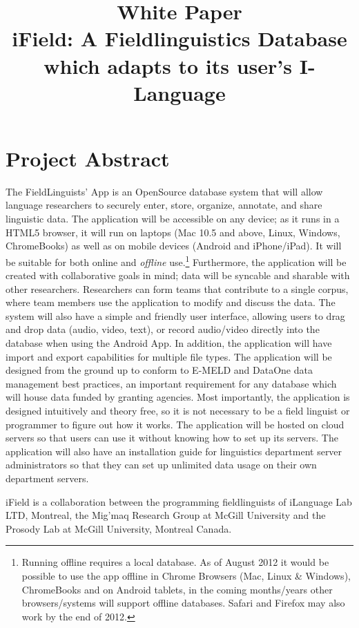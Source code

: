 \documentclass[12 pt]{article}
\title{White Paper \\ iField: A Fieldlinguistics Database which adapts to its user's I-Language}
\author{}
\date{}
\begin{document}
\maketitle{} 

\tableofcontents

\section {Project Abstract}

The FieldLinguists' App is an OpenSource database system that will allow language researchers to securely enter, store, organize, annotate, and share linguistic data. The application will be accessible on any device; as it runs in a HTML5 browser, it will run on laptops (Mac  10.5 and above, Linux, Windows, ChromeBooks) as well as on mobile devices (Android and iPhone/iPad).  It will be suitable for both online and \emph{offline} use.\footnote{Running offline requires  a local database. As of August 2012 it would be possible to use the app offline in Chrome Browsers (Mac, Linux \& Windows), ChromeBooks and on Android tablets, in the coming months/years other browsers/systems will support offline databases. Safari and Firefox may also work by the end of 2012.}  Furthermore, the application will be created with collaborative goals in mind;  data will be syncable and sharable with other researchers.  Researchers can form teams that contribute to a single corpus, where team members use the application to modify and discuss the data. The system will also have a simple and friendly user interface, allowing users to drag and drop data (audio, video, text), or record audio/video directly into the database when using the Android App. In addition, the application will have import and export capabilities for multiple file types. The application will be designed from the ground up to conform to E-MELD and DataOne data management best practices, an important requirement for any database which will house data funded by granting agencies.  Most importantly, the application is designed intuitively and theory free, so it is not necessary to be a field linguist or programmer to figure out how it works. The application will be hosted on cloud servers so that users can use it without knowing how to set up its servers. The application will also have an installation guide for linguistics department server administrators so that they can set up unlimited data usage on their own department servers.


iField is a collaboration between  the programming fieldlinguists of iLanguage Lab LTD, Montreal, the Mig'maq Research Group at McGill University and the Prosody Lab at McGill University, Montreal Canada.
\end{document}
